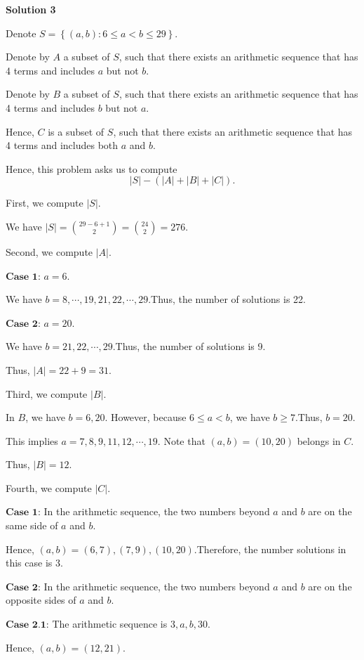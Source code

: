\begin{enumerate}
\textbf{Solution 3}

Denote $S = \left\{ (a, b) : 6 \leq a < b \leq 29 \right\}$.

 Denote by $A$ a subset of $S$, such that there exists an arithmetic sequence that has 4 terms and includes $a$ but not $b$.

 Denote by $B$ a subset of $S$, such that there exists an arithmetic sequence that has 4 terms and includes $b$ but not $a$.

 Hence, $C$ is a subset of $S$, such that there exists an arithmetic sequence that has 4 terms and includes both $a$ and $b$.

 Hence, this problem asks us to compute
 \[ | S | - \left( | A | + | B | + | C | \right) . \]

 First, we compute $| S |$.

 We have $| S | = \binom{29 - 6 + 1}{2} = \binom{24}{2} = 276$.

 Second, we compute $| A |$.

 $\textbf{Case 1}$: $a = 6$.

 We have $b = 8 , \cdots , 19, 21, 22, \cdots, 29$.Thus, the number of solutions is 22.

 $\textbf{Case 2}$: $a = 20$.

 We have $b = 21, 22, \cdots , 29$.Thus, the number of solutions is 9.

 Thus, $| A | = 22 + 9 = 31$.

 Third, we compute $| B |$.

 In $B$, we have $b = 6, 20$. However, because $6 \leq a < b$, we have $b \geq 7$.Thus, $b = 20$.

 This implies $a = 7, 8, 9, 11, 12, \cdots , 19$. Note that $(a, b)=(10, 20)$ belongs in $C$.

 Thus, $| B | = 12$.

 Fourth, we compute $| C |$.

 $\textbf{Case 1}$: In the arithmetic sequence, the two numbers beyond $a$ and $b$ are on the same side of $a$ and $b$.

 Hence, $(a, b) = (6 , 7), (7, 9) , (10, 20)$.Therefore, the number solutions in this case is 3.

 $\textbf{Case 2}$: In the arithmetic sequence, the two numbers beyond $a$ and $b$ are on the opposite sides of $a$ and $b$.

 $\textbf{Case 2.1}$: The arithmetic sequence is $3, a, b, 30$.

 Hence, $(a, b) = (12, 21)$.


\end{enumerate}
